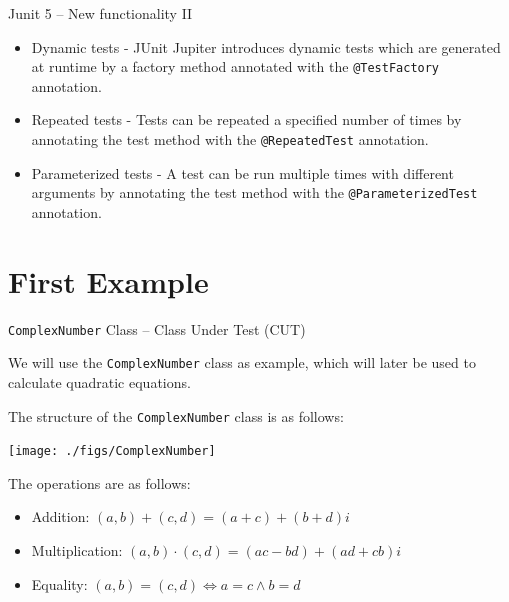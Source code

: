 \documentclass[11pt, xcolor=svgnames]{beamer}
\begin{document}

\begin{frame}{Junit 5 -- New functionality II}

  \begin{itemize}
    \item Dynamic tests - JUnit Jupiter introduces dynamic tests which are generated at runtime by a factory method annotated with the \texttt{@TestFactory} annotation.
  
    \item Repeated tests - Tests can be repeated a specified number of times by annotating the test method with the \texttt{@RepeatedTest} annotation.
  
    \item Parameterized tests - A test can be run multiple times with different arguments by annotating the test method with the \texttt{@ParameterizedTest} annotation.
  \end{itemize}

\end{frame}


\section{First Example}



\begin{frame}[fragile]{\texttt{ComplexNumber} Class -- Class Under Test (CUT)}

  We will use the \texttt{ComplexNumber} class as example, which will later be used to calculate quadratic equations.
  
  The structure of the \texttt{ComplexNumber} class is as follows:
  
  \begin{center}
   \texttt{[image: ./figs/ComplexNumber]}
  \end{center}
  
  The operations are as follows:
  
  \begin{itemize}
   \item Addition: $(a,b)+(c,d)=(a+c)+(b+d)i$
   \item Multiplication: $(a,b)\cdot(c,d)=(ac-bd) + (ad+cb)i$
   \item Equality: $(a,b)=(c,d) \Leftrightarrow a=c \wedge b=d$
  \end{itemize}
  
  \end{frame}
\end{document}

